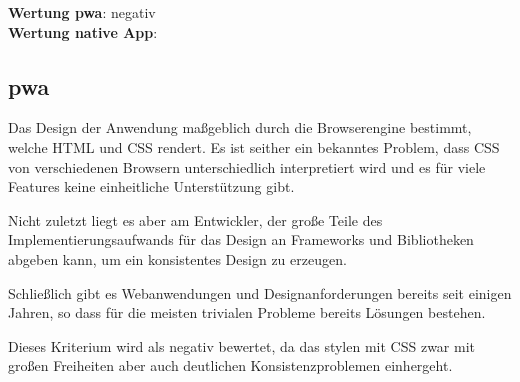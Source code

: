 \textbf{Wertung \ac{pwa}}: negativ\\
\textbf{Wertung native App}:  \\

\subsection{\ac{pwa}}
Das Design der Anwendung maßgeblich durch die Browserengine bestimmt, welche HTML und CSS rendert. Es ist seither ein bekanntes Problem, dass CSS von verschiedenen Browsern unterschiedlich interpretiert wird und es für viele Features keine einheitliche Unterstützung gibt.

Nicht zuletzt liegt es aber am Entwickler, der große Teile des Implementierungsaufwands für das Design an Frameworks und Bibliotheken abgeben kann, um ein konsistentes Design zu erzeugen. 

Schließlich gibt es Webanwendungen und Designanforderungen bereits seit einigen Jahren, so dass für die meisten trivialen Probleme bereits Lösungen bestehen.

Dieses Kriterium wird als negativ bewertet, da das stylen mit CSS zwar mit großen Freiheiten aber auch deutlichen Konsistenzproblemen einhergeht.